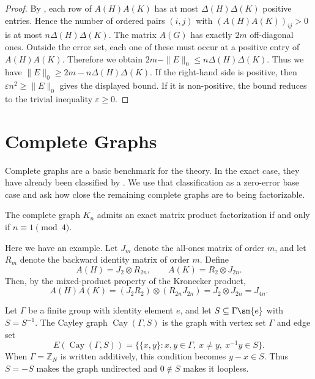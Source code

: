 \documentclass{file}
\newcommand{\eps}{\varepsilon}
\newcommand{\Cay}{\operatorname{Cay}}
\begin{document}
\begin{proof}
By , each row of $A(H)A(K)$ has at most
$\Delta(H)\Delta(K)$ positive entries.  Hence the number of ordered pairs
$(i,j)$ with $(A(H)A(K))_{ij}>0$ is at most
$n\Delta(H)\Delta(K)$.  The matrix $A(G)$ has exactly $2m$ off-diagonal ones.
Outside the error set, each one of these must occur at a positive entry of $A(H)A(K)$.  
Therefore we obtain  $2m-\|E\|_0\le n\Delta(H)\Delta(K)$.
Thus we have  $\|E\|_0\ge 2m-n\Delta(H)\Delta(K)$.
If the right-hand side is positive, then
$\eps n^2\ge \|E\|_0$ gives the displayed bound.  If it is non-positive, the bound reduces to the trivial inequality $\eps\ge 0$.
\end{proof}

\section{Complete Graphs}
\label{sec:complete}

Complete graphs are a basic benchmark for the theory.  In the exact case, they have already been classified by \citet{maghsoudi2023matrix}. 
We use that classification as a zero-error base case and ask how close the remaining complete graphs are to being factorizable.

\begin{lem}{\rm\cite[Theorem 1]{maghsoudi2023matrix}}
\label{thm:mms-complete}
The complete graph $K_n$ admits an exact matrix product factorization if and only if $n\equiv 1\pmod 4$.
\end{lem}

Here we have an example.
Let $J_m$ denote the all-ones matrix of order $m$, and let $R_m$ denote the backward identity matrix of order $m$. Define
\[
A(H)=J_2\otimes R_{2n},\qquad A(K)=R_2\otimes J_{2n}.
\]
Then, by the mixed-product property of the Kronecker product,
\[
A(H)A(K)
=(J_2R_2)\otimes (R_{2n}J_{2n})
=J_2\otimes J_{2n}
=J_{4n}.
\]


\begin{defn}
Let $\Gamma$ be a finite group with identity element $e$, and let
$S\subseteq \Gamma\sm  \{e\}$ with $S=S^{-1}$.  The Cayley graph
$\Cay(\Gamma,S)$ is the graph with vertex set $\Gamma$ and edge set
\[
  E(\Cay(\Gamma,S))
  =
  \{\{x,y\}:x,y\in\Gamma,\ x\neq y,\ x^{-1}y\in S\}.
\]
When $\Gamma=\mathbb Z_N$ is written additively, this condition becomes
$y-x\in S$.  Thus $S=-S$ makes the graph undirected and $0\notin S$ makes it
loopless.
\end{defn}
\end{document}
